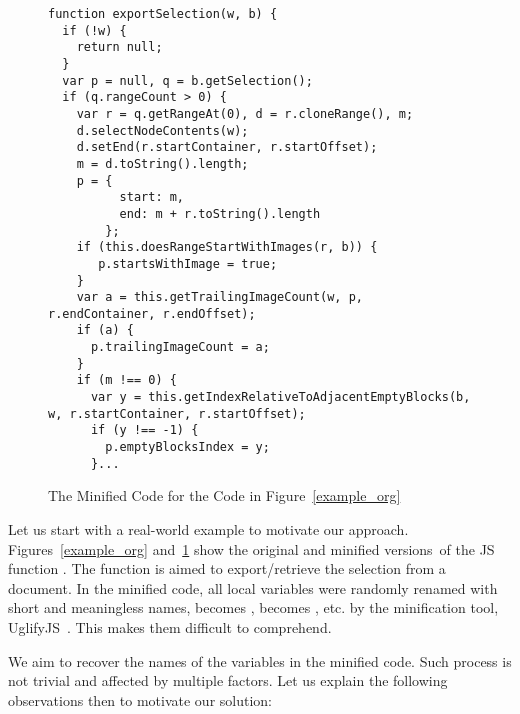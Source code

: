 \begin{figure}[t]
	\centering
	\begin{lstlisting}[]
function exportSelection(w, b) {
  if (!w) {
    return null;
  }
  var p = null, q = b.getSelection();
  if (q.rangeCount > 0) {
    var r = q.getRangeAt(0), d = r.cloneRange(), m;
    d.selectNodeContents(w);
    d.setEnd(r.startContainer, r.startOffset);
    m = d.toString().length;
    p = {
          start: m,
          end: m + r.toString().length
        };
    if (this.doesRangeStartWithImages(r, b)) {
       p.startsWithImage = true;
    }
    var a = this.getTrailingImageCount(w, p, r.endContainer, r.endOffset);
    if (a) {
      p.trailingImageCount = a;
    }
    if (m !== 0) {
      var y = this.getIndexRelativeToAdjacentEmptyBlocks(b, w, r.startContainer, r.startOffset);
      if (y !== -1) {
        p.emptyBlocksIndex = y;
      }...
\end{lstlisting}
\vspace{-12pt}
\caption{The Minified Code for the Code in Figure~\ref{example_org}}
\label{example_sim}
\end{figure}

Let us start with a real-world example to motivate our approach.
Figures~\ref{example_org} and~\ref{example_sim} show the original and
minified versions~of the JS function .  The
function is aimed to export/retrieve the selection from a document.
%
In the minified code, all local variables were randomly renamed with
short and meaningless names, \eg {} becomes ,
 becomes , etc. by the minification tool,
\eg UglifyJS~\cite{uglifyJS}. This makes them difficult to
comprehend.


We aim to recover the names of the variables in the minified
code. Such process is not trivial and affected by multiple factors.
Let us explain the following observations then to motivate our
solution:

